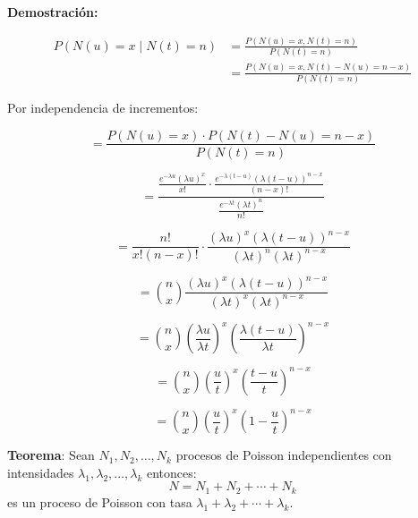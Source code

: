 \documentclass[12pt,a4paper]{article}
\newcommand{\teorema}[1]{%
\begin{teoremabox}
\textbf{Teorema}: #1
\end{teoremabox}
}
\begin{document}
\textbf{Demostración:}

\begin{align*}
P(N(u) = x \mid N(t) = n) &= \frac{P(N(u) = x, N(t) = n)}{P(N(t) = n)} \\
&= \frac{P(N(u) = x, N(t) - N(u) = n - x)}{P(N(t) = n)}
\end{align*}

Por independencia de incrementos:

\begin{equation*}
= \frac{P(N(u) = x) \cdot P(N(t) - N(u) = n - x)}{P(N(t) = n)}
\end{equation*}

\begin{equation*}
= \frac{\frac{e^{-\lambda u} (\lambda u)^x}{x!} \cdot \frac{e^{-\lambda(t-u)} (\lambda(t-u))^{n-x}}{(n-x)!}}{\frac{e^{-\lambda t} (\lambda t)^n}{n!}}
\end{equation*}

\begin{equation*}
= \frac{n!}{x!(n-x)!} \cdot \frac{(\lambda u)^x (\lambda(t-u))^{n-x}}{(\lambda t)^n (\lambda t)^{n-x}}
\end{equation*}

\begin{equation*}
= \binom{n}{x} \frac{(\lambda u)^x (\lambda(t-u))^{n-x}}{(\lambda t)^x (\lambda t)^{n-x}}
\end{equation*}

\begin{equation*}
= \binom{n}{x} \left(\frac{\lambda u}{\lambda t}\right)^x \left(\frac{\lambda(t-u)}{\lambda t}\right)^{n-x}
\end{equation*}

\begin{equation*}
= \binom{n}{x} \left(\frac{u}{t}\right)^x \left(\frac{t-u}{t}\right)^{n-x}
\end{equation*}

\begin{equation*}
= \binom{n}{x} \left(\frac{u}{t}\right)^x \left(1 - \frac{u}{t}\right)^{n-x}
\end{equation*}

\teorema{Sean $N_1, N_2, \ldots, N_k$ procesos de Poisson independientes con intensidades $\lambda_1, \lambda_2, \ldots, \lambda_k$ entonces:
\begin{equation*}
N = N_1 + N_2 + \cdots + N_k
\end{equation*}
es un proceso de Poisson con tasa $\lambda_1 + \lambda_2 + \cdots + \lambda_k$.}
\end{document}
